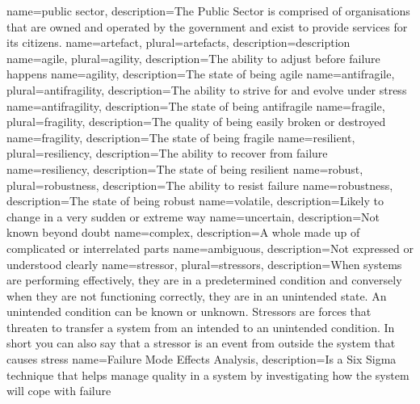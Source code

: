{
	name={public sector},
	description={The Public Sector is comprised of organisations that are owned and operated by the government and exist to provide services for its citizens.}
}
{
	name={artefact},
	plural={artefacts},
	description={description}
}
{
	name=agile,
	plural={agility},
	description={The ability to adjust before failure happens}
}
{
	name={agility},
	description={The state of being agile}
}
{
	name=antifragile,
	plural={antifragility},
	description={The ability to strive for and evolve under stress}
}
{
	name={antifragility},
	description={The state of being antifragile}
}
{
	name=fragile,
	plural={fragility},
	description={The quality of being easily broken or destroyed}
}
{
	name={fragility},
	description={The state of being fragile}
}
{
	name=resilient,
	plural={resiliency},
	description={The ability to recover from failure}
}
{
	name={resiliency},
	description={The state of being resilient}
}
{
	name=robust,
	plural={robustness},
	description={The ability to resist failure}
}
{
	name={robustness},
	description={The state of being robust}
}
{
	name=volatile,
	description={Likely to change in a very sudden or extreme way}
}
{
	name=uncertain,
	description={Not known beyond doubt}
}
{
	name=complex,
	description={A whole made up of complicated or interrelated parts}
}
{
	name=ambiguous,
	description={Not expressed or understood clearly}
}
{
	name={stressor},
	plural={stressors},
	description={When systems are performing effectively, they are in a predetermined condition and conversely when they are not functioning correctly, they are in an unintended state. An unintended condition can be known or unknown. Stressors are forces that threaten to transfer a system from an intended to an unintended condition. In short you can also say that a stressor is an event from outside the system that causes stress}
}
{
	name={Failure Mode Effects Analysis},
	description={Is a Six Sigma technique that helps manage quality in a system by investigating how the system will cope with failure}
}
